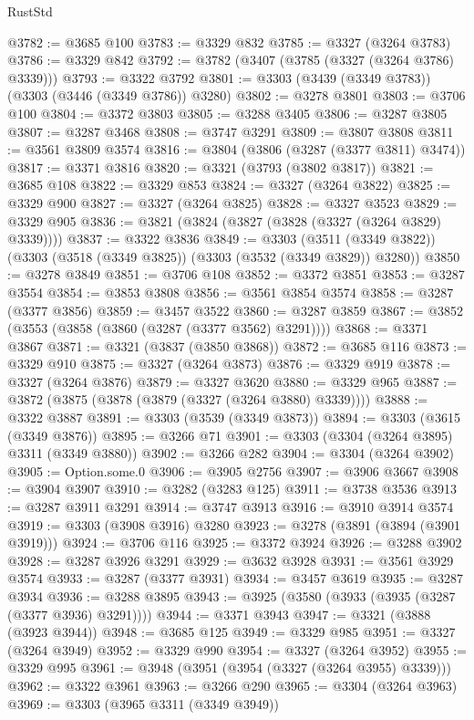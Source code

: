 \begin{lexlean}{RustStd}
\begin{coremodule}
@3782 := @3685 @100
@3783 := @3329 @832
@3785 := @3327 (@3264 @3783)
@3786 := @3329 @842
@3792 := @3782 (@3407 (@3785 (@3327 (@3264 @3786) @3339)))
@3793 := @3322 @3792
@3801 := @3303 (@3439 (@3349 @3783)) (@3303 (@3446 (@3349 @3786)) @3280)
@3802 := @3278 @3801
@3803 := @3706 @100
@3804 := @3372 @3803
@3805 := @3288 @3405
@3806 := @3287 @3805
@3807 := @3287 @3468
@3808 := @3747 @3291
@3809 := @3807 @3808
@3811 := @3561 @3809 @3574
@3816 := @3804 (@3806 (@3287 (@3377 @3811) @3474))
@3817 := @3371 @3816
@3820 := @3321 (@3793 (@3802 @3817))
@3821 := @3685 @108
@3822 := @3329 @853
@3824 := @3327 (@3264 @3822)
@3825 := @3329 @900
@3827 := @3327 (@3264 @3825)
@3828 := @3327 @3523
@3829 := @3329 @905
@3836 := @3821 (@3824 (@3827 (@3828 (@3327 (@3264 @3829) @3339))))
@3837 := @3322 @3836
@3849 := @3303
    (@3511 (@3349 @3822))
    (@3303 (@3518 (@3349 @3825)) (@3303 (@3532 (@3349 @3829)) @3280))
@3850 := @3278 @3849
@3851 := @3706 @108
@3852 := @3372 @3851
@3853 := @3287 @3554
@3854 := @3853 @3808
@3856 := @3561 @3854 @3574
@3858 := @3287 (@3377 @3856)
@3859 := @3457 @3522
@3860 := @3287 @3859
@3867 := @3852 (@3553 (@3858 (@3860 (@3287 (@3377 @3562) @3291))))
@3868 := @3371 @3867
@3871 := @3321 (@3837 (@3850 @3868))
@3872 := @3685 @116
@3873 := @3329 @910
@3875 := @3327 (@3264 @3873)
@3876 := @3329 @919
@3878 := @3327 (@3264 @3876)
@3879 := @3327 @3620
@3880 := @3329 @965
@3887 := @3872 (@3875 (@3878 (@3879 (@3327 (@3264 @3880) @3339))))
@3888 := @3322 @3887
@3891 := @3303 (@3539 (@3349 @3873))
@3894 := @3303 (@3615 (@3349 @3876))
@3895 := @3266 @71
@3901 := @3303 (@3304 (@3264 @3895) @3311 (@3349 @3880))
@3902 := @3266 @282
@3904 := @3304 (@3264 @3902)
@3905 := Option.some.{0}
@3906 := @3905 @2756
@3907 := @3906 @3667
@3908 := @3904 @3907
@3910 := @3282 (@3283 @125)
@3911 := @3738 @3536
@3913 := @3287 @3911 @3291
@3914 := @3747 @3913
@3916 := @3910 @3914 @3574
@3919 := @3303 (@3908 @3916) @3280
@3923 := @3278 (@3891 (@3894 (@3901 @3919)))
@3924 := @3706 @116
@3925 := @3372 @3924
@3926 := @3288 @3902
@3928 := @3287 @3926 @3291
@3929 := @3632 @3928
@3931 := @3561 @3929 @3574
@3933 := @3287 (@3377 @3931)
@3934 := @3457 @3619
@3935 := @3287 @3934
@3936 := @3288 @3895
@3943 := @3925 (@3580 (@3933 (@3935 (@3287 (@3377 @3936) @3291))))
@3944 := @3371 @3943
@3947 := @3321 (@3888 (@3923 @3944))
@3948 := @3685 @125
@3949 := @3329 @985
@3951 := @3327 (@3264 @3949)
@3952 := @3329 @990
@3954 := @3327 (@3264 @3952)
@3955 := @3329 @995
@3961 := @3948 (@3951 (@3954 (@3327 (@3264 @3955) @3339)))
@3962 := @3322 @3961
@3963 := @3266 @290
@3965 := @3304 (@3264 @3963)
@3969 := @3303 (@3965 @3311 (@3349 @3949))

\end{coremodule}
\end{lexlean}
